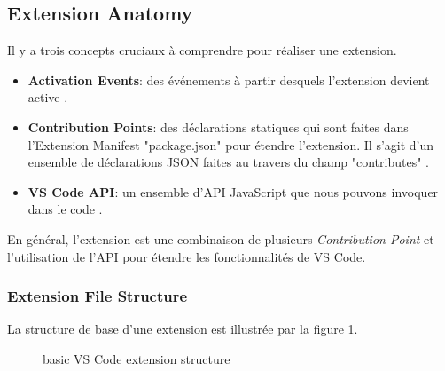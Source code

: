 \documentclass[
    iict, %
    il, %
]{heig-tb}
\begin{document}
\subsection{Extension Anatomy}
Il y a trois concepts cruciaux à comprendre pour réaliser une extension.

\begin{itemize}
    \item \textbf{Activation Events}: des événements à partir desquels l'extension devient active \cite{activation-events}.
    \item \textbf{Contribution Points}: des déclarations statiques qui sont faites dans l'Extension Manifest "package.json" pour étendre l'extension. Il s'agit d'un ensemble de déclarations JSON faites au travers du champ "contributes" \cite{contribution-points}.
    \item \textbf{VS Code API}: un ensemble d'API JavaScript que nous pouvons invoquer dans le code \cite{vs-code-api}.
\end{itemize}

En général, l'extension est une combinaison de plusieurs \emph{Contribution Point} et l'utilisation de l'API pour étendre les fonctionnalités de VS Code.

\subsubsection{Extension File Structure}\label{Extension File Structure}

La structure de base d'une extension est illustrée par la figure \ref{basic VS Code extension structure}.

\begin{figure}[H] %
    \centering
    \caption[basic VS Code extension structure]{\label{basic VS Code extension structure} basic VS Code extension structure}
\end{figure}
\end{document}
